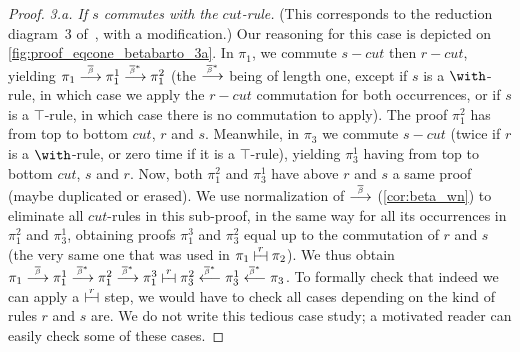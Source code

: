 \documentclass{lmcs}
\newcommand{\symboltext}[2]{\mathrel{\overset{\makebox[0pt]{\mbox{\normalfont\tiny\sffamily \ensuremath{#1}}}}{#2}}} %
\newcommand{\betabar}{\overline{\beta}}
\newcommand{\betabarto}{\symboltext{\betabar}{\longrightarrow}}
\newcommand{\betabartostar}{\symboltext{\betabar^*}{\longrightarrow}}
\newcommand{\betabarfromstar}{\symboltext{\betabar^*}{\longleftarrow}}
\newcommand{\vdashv}{\mathrel{\lower .22ex \hbox{$\vdash\!\dashv$}}}
\DeclareRobustCommand{\astsymbol}[1]{\mathrel{\ooalign{{$\vdashv$}\crcr{$\stackrel{#1}{\hphantom{\vdashv}\vphantom{\to}}$}}}}
\newcommand{\eqcone}{\astsymbol{r}} %
\newcommand*{\proofpar}[1]{\textit{#1}}
\begin{document}
\begin{proof}
\proofpar{3.a. If $s$ commutes with the $cut$-rule.}
(This corresponds to the reduction diagram~3 of~\cite[Section~B.2.1]{calculusformall}, with a modification.)
Our reasoning for this case is depicted on \autoref{fig:proof_eqcone_betabarto_3a}.
In $\pi_1$, we commute $s-cut$ then $r-cut$, yielding $\pi_1\betabarto\pi_1^1\betabartostar\pi_1^2$ (the $\betabartostar$ being of length one, except if $s$ is a $\with$-rule, in which case we apply the $r-cut$ commutation for both occurrences, or if $s$ is a $\top$-rule, in which case there is no commutation to apply).
The proof $\pi_1^2$ has from top to bottom $cut$, $r$ and $s$.
Meanwhile, in $\pi_3$ we commute $s-cut$ (twice if $r$ is a $\with$-rule, or zero time if it is a $\top$-rule), yielding $\pi_3^1$ having from top to bottom $cut$, $s$ and $r$.
Now, both $\pi_1^2$ and $\pi_3^1$ have above $r$ and $s$ a same proof (maybe duplicated or erased).
We use normalization of $\betabarto$ (\autoref{cor:beta_wn}) to eliminate all $cut$-rules in this sub-proof, in the same way for all its occurrences in $\pi_1^2$ and $\pi_3^1$, obtaining proofs $\pi_1^3$ and $\pi_3^2$ equal up to the commutation of $r$ and $s$ (the very same one that was used in $\pi_1\eqcone\pi_2$).
We thus obtain $\pi_1\betabarto\pi_1^1\betabartostar\pi_1^2\betabartostar\pi_1^3\eqcone\pi_3^2\betabarfromstar\pi_3^1\betabarfromstar\pi_3$.
To formally check that indeed we can apply a $\eqcone$ step, we would have to check all cases depending on the kind of rules $r$ and $s$ are.
We do not write this tedious case study; a motivated reader can easily check some of these cases.


\end{proof}
\end{document}
